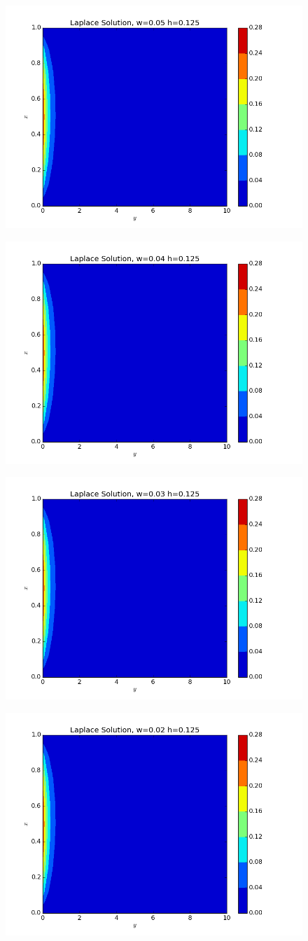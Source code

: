 \documentclass[10pt,letter]{article}
\begin{document}
\begin{figure}[H]
  \centering
    \includegraphics[width=.6\textwidth]{homework7_problem1_plot13}
\end{figure}
\begin{figure}[H]
  \centering
    \includegraphics[width=.6\textwidth]{homework7_problem1_plot14}
\end{figure}
\begin{figure}[H]
  \centering
    \includegraphics[width=.6\textwidth]{homework7_problem1_plot15}
\end{figure}
\begin{figure}[H]
  \centering
    \includegraphics[width=.6\textwidth]{homework7_problem1_plot16}
\end{figure}
\end{document}
